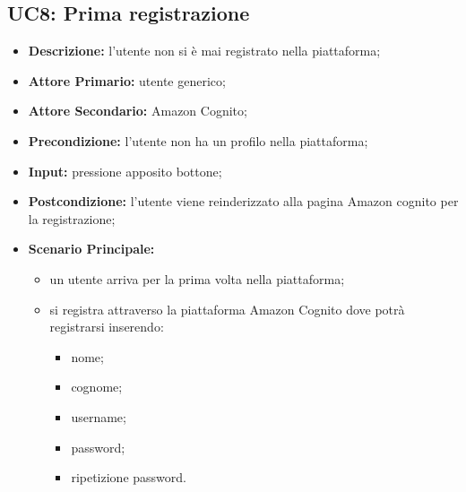         \subsection{UC8: Prima registrazione}
        \label{sec:UC8}
        \begin{itemize}
            \item \textbf{Descrizione:} l'utente non si è mai registrato nella piattaforma;
            \item \textbf{Attore Primario:} utente generico;
            \item \textbf{Attore Secondario:} Amazon Cognito;
            \item \textbf{Precondizione:} l'utente non ha un profilo nella piattaforma;
            \item \textbf{Input:} pressione apposito bottone;
            \item \textbf{Postcondizione:} l'utente viene reinderizzato alla pagina Amazon cognito per la registrazione;
            \item \textbf{Scenario Principale:}
            \begin{itemize}
                \item un utente arriva per la prima volta nella piattaforma;
                \item si registra attraverso la piattaforma Amazon Cognito dove potrà registrarsi inserendo:
                \begin{itemize}
                    \item nome;
                    \item cognome;
                    \item username;
                    \item password;
                    \item ripetizione password.
                \end{itemize}
            \end{itemize} 
        \end{itemize}

